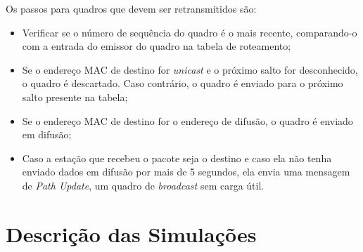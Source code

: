 \documentclass[letterpaper, 10 pt, conference]{ieeeconf}  %
\begin{document}
Os passos para quadros que devem ser retransmitidos são:

\begin{itemize}
	\item Verificar se o número de sequência do quadro é o mais recente, comparando-o com a entrada do emissor do quadro na tabela de roteamento;
    \item Se o endereço MAC de destino for \textit{unicast} e o próximo salto for desconhecido, o quadro é descartado. Caso contrário, o quadro é enviado para o próximo salto presente na tabela;
    \item Se o endereço MAC de destino for o endereço de difusão, o quadro é enviado em difusão;
    \item Caso a estação que recebeu o pacote seja o destino e caso ela não tenha enviado dados em difusão por mais de 5 segundos, ela envia uma mensagem de \textit{Path Update}, um quadro de \textit{broadcast} sem carga útil.
\end{itemize}

%





\section{Descrição das Simulações}
\label{sec:simscenario}
\end{document}
